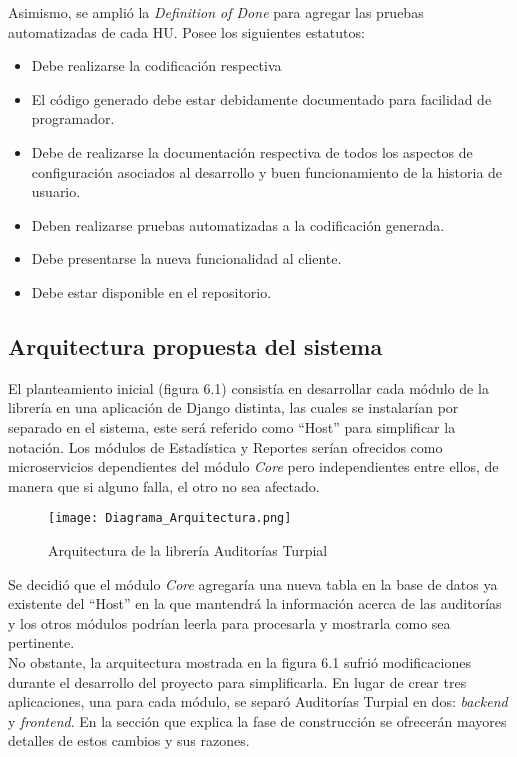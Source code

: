 Asimismo, se amplió la \textit{Definition of Done} para agregar las pruebas automatizadas de cada HU. Posee los siguientes estatutos:

\begin{itemize}
    \item Debe realizarse la codificación respectiva
    \item El código generado debe estar debidamente documentado para facilidad de programador.
    \item Debe de realizarse la documentación respectiva de todos los aspectos de configuración asociados al desarrollo y buen funcionamiento de la historia de usuario.
    \item Deben realizarse pruebas automatizadas a la codificación generada.
    \item Debe presentarse la nueva funcionalidad al cliente.
    \item Debe estar disponible en el repositorio.
\end{itemize}

\subsection{Arquitectura propuesta del sistema}

El planteamiento inicial (figura 6.1) consistía en desarrollar cada módulo de la librería en una aplicación de Django distinta, las cuales se instalarían por separado en el sistema, este será referido como “Host” para simplificar la notación. Los módulos de Estadística y Reportes serían ofrecidos como microservicios dependientes del módulo \textit{Core} pero independientes entre ellos, de manera que si alguno falla, el otro no sea afectado.\\

\begin{figure}
\centering
\texttt{[image: Diagrama\_Arquitectura.png]}
\caption{Arquitectura de la librería Auditorías Turpial}
\label{fig:figure6.1}
\end{figure}

Se decidió que el módulo \textit{Core} agregaría una nueva tabla en la base de datos ya existente del “Host” en la que mantendrá la información acerca de las auditorías y los otros módulos podrían leerla para procesarla y mostrarla como sea  pertinente.\\

No obstante, la arquitectura mostrada en la figura 6.1 sufrió modificaciones durante el desarrollo del proyecto para simplificarla. En lugar de crear tres aplicaciones, una para cada módulo, se separó Auditorías Turpial en dos: \textit{backend} y \textit{frontend}. En la sección que explica la fase de construcción se ofrecerán mayores detalles de estos cambios y sus razones. \\

